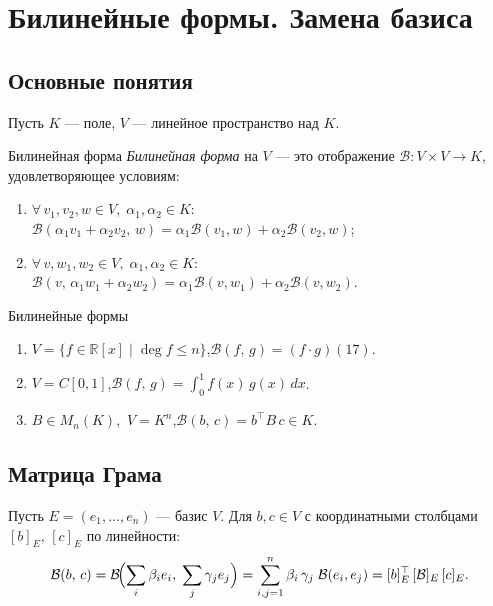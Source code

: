 \section{Билинейные формы. Замена базиса}

\subsection*{Основные понятия}

Пусть $K$ — поле, $V$ — линейное пространство над $K$.
\begin{Definition}{Билинейная форма}{}
	\textit{Билинейная форма} на $V$ — это отображение $\mathcal{B} \colon V \times V \to K$, удовлетворяющее условиям:
	\begin{enumerate}
		\item $\forall\, v_1, v_2, w \in V,\; \alpha_1, \alpha_2 \in K$:\quad
		$\mathcal{B}(\alpha_1 v_1 + \alpha_2 v_2,\, w) = \alpha_1 \mathcal{B}(v_1, w) + \alpha_2 \mathcal{B}(v_2, w)$;
		\item $\forall\, v, w_1, w_2 \in V,\; \alpha_1, \alpha_2 \in K$:\quad
		$\mathcal{B}(v,\, \alpha_1 w_1 + \alpha_2 w_2) = \alpha_1 \mathcal{B}(v, w_1) + \alpha_2 \mathcal{B}(v, w_2)$.
	\end{enumerate}
\end{Definition}

\begin{Example}{Билинейные формы}{}
	\begin{enumerate}
		\item $V = \{f \in \mathbb{R}[x] \mid \deg f \leq n\}$,\quad $\mathcal{B}(f,\, g) = (f \cdot g)(17)$.
		\item $V = C[0,1]$,\quad $\mathcal{B}(f,\, g) = \displaystyle\int_0^1 f(x)\,g(x)\,dx$.
		\item $B \in M_n(K)$,\ $V = K^n$,\quad $\mathcal{B}(b,\, c) = b^{\top} B\, c \in K$.
	\end{enumerate}
\end{Example}

\subsection*{Матрица Грама}

Пусть $E = (e_1, \ldots, e_n)$ — базис $V$.
Для $b, c \in V$ с координатными столбцами $[b]_E,\, [c]_E$ по линейности:
\[
\mathcal{B}(b,\,c)
= \mathcal{B}\!\Bigl(\sum_i \beta_i e_i,\; \sum_j \gamma_j e_j\Bigr)
= \sum_{i,j=1}^{n} \beta_i\,\gamma_j\;\mathcal{B}(e_i, e_j)
= [b]_E^{\top}\,[\mathcal{B}]_E\,[c]_E.
\] 

